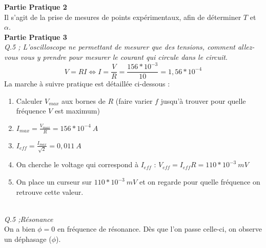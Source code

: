 \documentclass	[11pt, a4paper, openany]{book}
\begin{document}
\textbf{Partie Pratique 2}\\
Il s'agit de la prise de mesures de points expérimentaux, afin de déterminer $T$ et $\alpha$.\\

\textbf{Partie Pratique 3}\\
\textit{Q.5 ; L'oscilloscope ne permettant de mesurer que des tensions, comment allez-vous vous y prendre pour mesurer le courant qui circule dans le circuit}.
\begin{equation}
V = RI \Leftrightarrow I = \frac{V}{R} = \frac{156*10^{-3
}}{10} = 1,56*10^{-4}
\end{equation}
La marche à suivre pratique est détaillée ci-dessous :
\begin{enumerate}
\item Calculer $V_{max}$ aux bornes de $R$ (faire varier $f$ jusqu'à trouver pour quelle fréquence $V$ est maximum)
\item $I_{max} = \frac{V_{max}}{R} = 156*10^{-4}\ A$
\item $I_{eff} = \frac{I_{max}}{\sqrt{2}} = 0,011\ A$
\item On cherche le voltage qui correspond à $I_{eff}$ : $V_{eff} = I_{eff} R = 110*10^{-3}\ mV$
\item On place un curseur sur $110*10^{-3}\ mV$ et on regarde pour quelle fréquence on retrouve cette valeur.
\end{enumerate}
\ \\
\textit{Q.5 ;Résonance}\\
On a bien $\phi = 0$ en fréquence de résonance. Dès que l'on passe celle-ci, on observe un déphasage ($\phi$).\\
\end{document}
